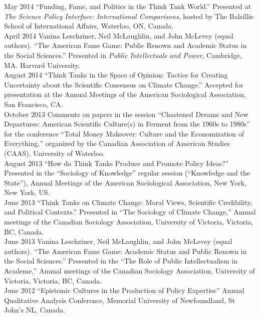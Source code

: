 \documentclass[11pt,usenames,dvipsnames]{article}
\begin{document}
\ind May 2014 ``Funding, Fame, and Politics in the Think Tank World.'' Presented at \emph{The Science Policy Interface: International Comparisons}, hosted by The Balsillie School of International Affairs, Waterloo, ON, Canada. \\

\ind April 2014 Vanina Leschziner, Neil McLaughlin, and John McLevey (equal authors). ``The American Fame Game: Public Renown and Academic Status in the Social Sciences.'' Presented in \emph{Public Intellectuals and Power}, Cambridge, MA. Harvard University. \\

\ind August 2014 ``Think Tanks in the Space of Opinion: Tactics for Creating Uncertainty about the Scientific Consensus on Climate Change.'' Accepted for presentation at the Annual Meetings of the American Sociological Association, San Francisco, CA. \\

\ind October 2013 Comments on papers in the session ``Chastened Dreams and New Departures: American Scientific Culture(s) in Ferment from the 1960s to 1980s'' for the conference ``Total Money Makeover: Culture and the Economization of Everything,'' organized by the Canadian Association of American Studies (CAAS), University of Waterloo. \\

\ind August 2013 ``How do Think Tanks Produce and Promote Policy Ideas?'' Presented in the ``Sociology of Knowledge'' regular session (``Knowledge and the State''), Annual Meetings of the American Sociological Association, New York, New York, US. \\

\ind June 2013 ``Think Tanks on Climate Change: Moral Views, Scientific Credibility, and Political Contexts.'' Presented in ``The Sociology of Climate Change,'' Annual meetings of the Canadian Sociology Association, University of Victoria, Victoria, BC, Canada. \\

\ind June 2013 Vanina Leschziner, Neil McLaughlin, and John McLevey (equal authors). ``The American Fame Game: Academic Status and Public Renown in the Social Sciences.'' Presented in the ``The Role of Public Intellectualism in Academe,'' Annual meetings of the Canadian Sociology Association, University of Victoria, Victoria, BC, Canada. \\

\ind June 2012 ``Epistemic Cultures in the Production of Policy Expertise'' Annual Qualitative Analysis Conference, Memorial University of Newfoundland, St John's NL, Canada.\\
\end{document}
